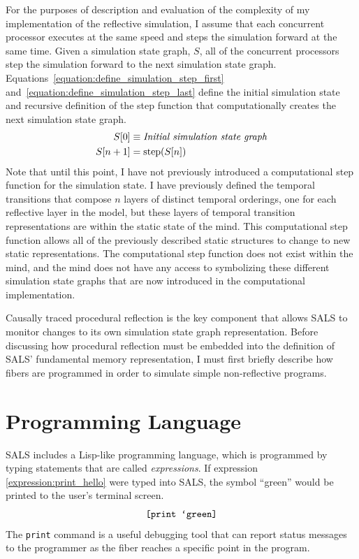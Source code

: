 For the purposes of description and evaluation of the complexity of my
implementation of the reflective simulation, I assume that each
concurrent processor executes at the same speed and steps the
simulation forward at the same time.  Given a simulation state graph,
$S$, all of the concurrent processors step the simulation forward to
the next simulation state graph.
Equations\ \ref{equation:define_simulation_step_first}
and\ \ref{equation:define_simulation_step_last} define the initial
simulation state and recursive definition of the step function that
computationally creates the next simulation state graph.
\begin{align}
\label{equation:define_simulation_step_first}
    S[0] &\equiv \text{\emph{Initial simulation state graph}} \\
\label{equation:define_simulation_step_last}
  S[n+1] &= \text{step}(S[n])
\end{align}
Note that until this point, I have not previously introduced a
computational step function for the simulation state.  I have
previously defined the temporal transitions that compose $n$ layers of
distinct temporal orderings, one for each reflective layer in the
model, but these layers of temporal transition representations are
within the static state of the mind.  This computational step function
allows all of the previously described static structures to change to
new static representations.  The computational step function does not
exist within the mind, and the mind does not have any access to
symbolizing these different simulation state graphs that are now
introduced in the computational implementation.

Causally traced procedural reflection is the key component that allows
SALS to monitor changes to its own simulation state graph
representation.  Before discussing how procedural reflection must be
embedded into the definition of SALS' fundamental memory
representation, I must first briefly describe how fibers are
programmed in order to simulate simple non-reflective programs.

\section{Programming Language}

SALS includes a Lisp-like programming language, which is programmed
by typing statements that are called \emph{expressions}.  If
expression \ref{expression:print_hello} were typed into SALS, the
symbol ``green'' would be printed to the user's terminal screen.
\begin{equation}
\label{expression:print_hello}
\text{\tt [print `green]}
\end{equation}
The {\tt print} command is a useful debugging tool that can report
status messages to the programmer as the fiber reaches a specific
point in the program.

